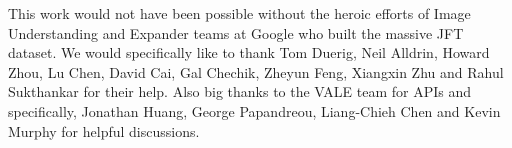 \documentclass[10pt,twocolumn,letterpaper]{article}
\begin{document}
\vspace{0.1in}
\small{
This work would not have been possible without the heroic efforts of Image Understanding and Expander teams at Google who built the massive JFT dataset. We would specifically like to thank Tom Duerig, Neil Alldrin, Howard Zhou, Lu Chen, David Cai, Gal Chechik, Zheyun Feng, Xiangxin Zhu and Rahul Sukthankar for their help. Also big thanks to the VALE team for APIs and specifically, Jonathan Huang, George Papandreou, Liang-Chieh Chen and Kevin Murphy for helpful discussions.}


\small{


}


\end{document}
